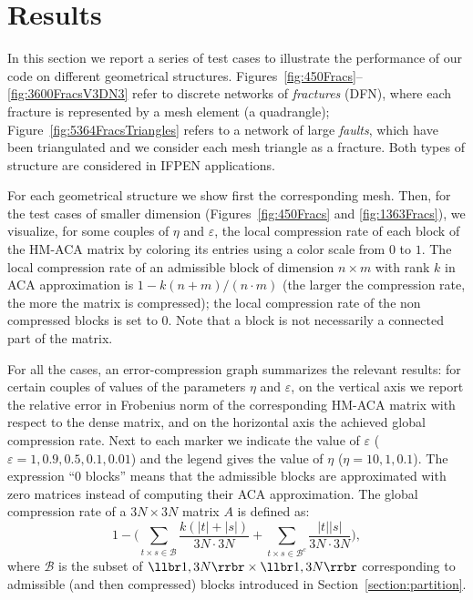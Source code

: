 


\section{Results}

In this section we report a series of test cases to illustrate the performance of our code on different geometrical structures.
Figures~\ref{fig:450Fracs}--\ref{fig:3600FracsV3DN3} refer to discrete networks of \emph{fractures} (DFN), where each fracture is represented by a mesh element (a quadrangle);    
Figure~\ref{fig:5364FracsTriangles} refers to a network of large \emph{faults}, which have been triangulated and we consider each mesh triangle as a fracture. Both types of structure are considered in IFPEN applications.

For each geometrical structure we show first the corresponding mesh.
Then, for the test cases of smaller dimension (Figures~\ref{fig:450Fracs} and \ref{fig:1363Fracs}), we visualize, for some couples of $\eta$ and $\varepsilon$, the local compression rate of each block of the HM-ACA matrix by coloring its entries using a color scale from $0$ to $1$. The local compression rate of an admissible block of dimension $n\times m$ with rank $k$ in ACA approximation is $1-k(n+m)/(n\cdot m)$ (the larger the compression rate, the more the matrix is compressed); the local compression rate of the non compressed blocks is set to $0$. Note that a block is not necessarily a connected part of the matrix.

For all the cases, an error-compression graph summarizes the relevant results: for certain couples of values of the parameters $\eta$ and $\varepsilon$, on the vertical axis we report the relative error in Frobenius norm of the corresponding HM-ACA matrix with respect to the dense matrix, and on the horizontal axis the achieved global compression rate. Next to each marker we indicate the value of $\varepsilon$ ($\varepsilon=1, 0.9, 0.5, 0.1, 0.01$) and the legend gives the value of $\eta$ ($\eta=10,1,0.1$). The expression ``0 blocks'' means that the admissible blocks are approximated with zero matrices instead of computing their ACA approximation.
The global compression rate of a $3N\times 3N$ matrix $A$ is defined as:
\[
1- \Biggl(\sum_{t \times s \in \mathscr{B}}{\frac{k(\lvert t \rvert + \lvert s \rvert)}{3N\cdot3N} } + 
\sum_{t \times s \in \mathscr{B}^c}{\frac{\lvert t \rvert \lvert s \rvert}{3N\cdot3N} } \Biggr),
\]
where $\mathscr{B}$ is the subset of $\llbr 1,3N\rrbr\times \llbr 1,3N\rrbr$ corresponding to admissible (and then compressed) blocks introduced in Section~\ref{section:partition}.

